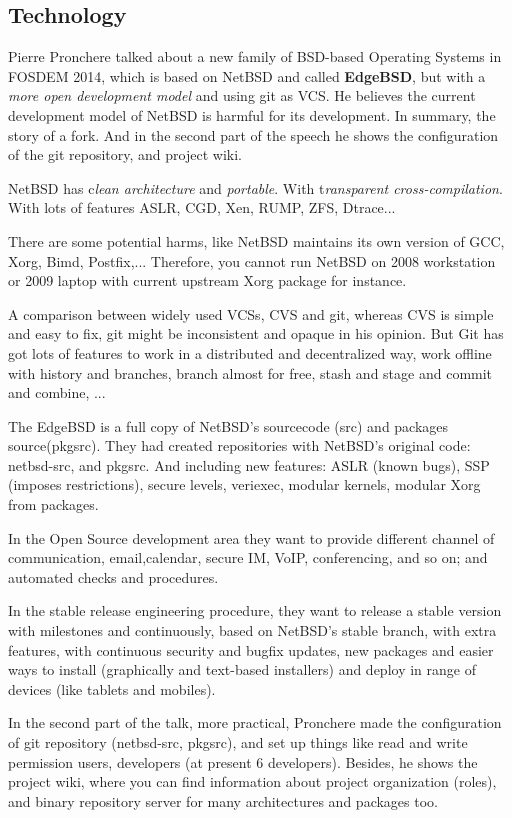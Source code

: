 \documentclass[11pt]{article}
\begin{document}
\subsection{Technology}

Pierre Pronchere talked about a new family of BSD-based Operating Systems in FOSDEM 2014, which is based on NetBSD and called \textbf{EdgeBSD}, but with a \emph{more open development model} and using git as VCS. He believes the current development model of NetBSD is harmful for its development. In summary, the story of a fork. And in the second part of the speech he shows the configuration of the git repository, and project wiki.

NetBSD has c\emph{lean architecture} and \emph{portable}. With t\emph{ransparent cross-compilation}. With lots of features ASLR, CGD, Xen, RUMP, ZFS, Dtrace...

There are some potential harms, like NetBSD maintains its own version of GCC, Xorg, Bimd, Postfix,... Therefore, you cannot run NetBSD on 2008 workstation or 2009 laptop with current upstream Xorg package for instance.
	
A comparison between widely used VCSs, CVS and git, whereas CVS is simple and easy to fix, git might be inconsistent and opaque in his opinion. But Git has got lots of features to work in a distributed and decentralized way, work offline with history and branches, branch almost for free, stash and stage and commit and combine, ...

The EdgeBSD is a full copy of NetBSD's sourcecode (src) and packages source(pkgsrc). They had created repositories with NetBSD's original code: netbsd-src, and pkgsrc. And including new features: ASLR (known bugs), SSP (imposes restrictions), secure levels, veriexec, modular kernels, modular Xorg from packages.

In the Open Source development area they want to provide different channel of communication, email,calendar, secure IM, VoIP, conferencing, and so on; and automated checks and procedures.

In the stable release engineering procedure, they want to release a stable version with milestones and continuously, based on NetBSD's stable branch, with extra features, with continuous security and bugfix updates, new packages and easier ways to install (graphically and text-based installers) and deploy in range of devices (like tablets and mobiles).

In the second part of the talk, more practical, Pronchere made the configuration of git repository (netbsd-src, pkgsrc), and set up things like read and write permission users, developers (at present 6 developers). Besides, he shows the project wiki, where you can find information about project organization (roles), and binary repository server for many architectures and packages too.
\end{document}
